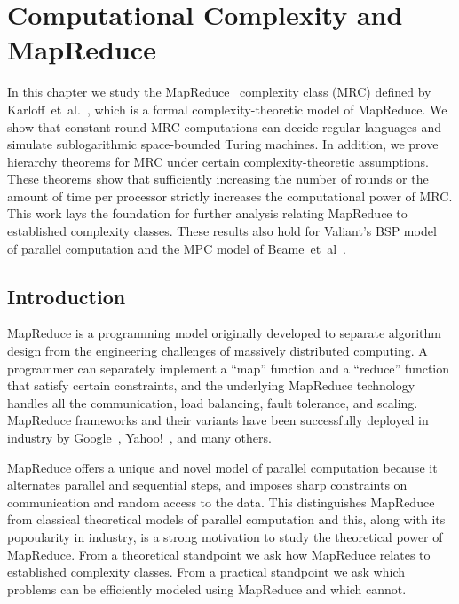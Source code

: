 
\chapter{Computational Complexity and MapReduce}

\newcommand{\N}{\mathbb{N}}
\newcommand{\mrc}{\textup{MRC}}
\newcommand{\bsp}{\textup{BSP}}
\newcommand{\SPACE}{\textup{SPACE}}
\newcommand{\TIME}{\textup{TIME}}
\newcommand{\TISP}{\textup{TISP}}
\renewcommand{\P}{\textup{P}}
\renewcommand{\L}{\textup{SPACE}(\log(n))}
\newcommand{\NP}{\textup{NP}}
\newcommand{\PSPACE}{\textup{PSPACE}}

In this chapter we study the MapReduce~\cite{DeanG08} complexity class (MRC)
defined by Karloff~et~al.~\cite{Karloff10}, which is a formal
complexity-theoretic model of MapReduce. We show that constant-round MRC
computations can decide regular languages and simulate sublogarithmic
space-bounded Turing machines. In addition, we prove hierarchy theorems for MRC
under certain complexity-theoretic assumptions. These theorems show that
sufficiently increasing the number of rounds or the amount of time per
processor strictly increases the computational power of MRC. This work lays the
foundation for further analysis relating MapReduce to established complexity
classes. These results also hold for Valiant's BSP model~\cite{Valiant90} of
parallel computation and the MPC model of Beame~et~al~\cite{BeameKS13}. 

\section{Introduction}

MapReduce is a programming model originally developed to separate algorithm
design from the engineering challenges of massively distributed computing. A
programmer can separately implement a ``map'' function and a ``reduce''
function that satisfy certain constraints, and the underlying MapReduce
technology handles all the communication, load balancing, fault tolerance, and
scaling. MapReduce frameworks and their variants have been successfully
deployed in industry by Google~\cite{DeanG08}, Yahoo!~\cite{ShvachkoKRC10}, and
many others.

MapReduce offers a unique and novel model of parallel computation because it
alternates parallel and sequential steps, and imposes sharp constraints on
communication and random access to the data. This distinguishes MapReduce from
classical theoretical models of parallel computation and this, along with its
popoularity in industry, is a strong motivation to study the theoretical power
of MapReduce. From a theoretical standpoint we ask how MapReduce relates to
established complexity classes. From a practical standpoint we ask which
problems can be efficiently modeled using MapReduce and which cannot.

